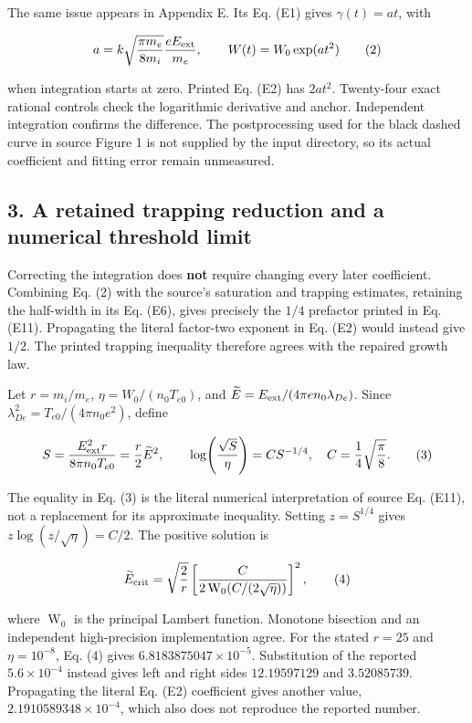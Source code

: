 The same issue appears in Appendix E. Its Eq. (E1) gives
\(\gamma(t)=at\), with

\[
a=k\sqrt{\frac{\pi m_e}{8m_i}}\frac{eE_{\rm ext}}{m_e},
\qquad W(t)=W_0\exp(at^2)
\tag{2}
\]

when integration starts at zero. Printed Eq. (E2) has \(2at^2\).
Twenty-four exact rational controls check the logarithmic derivative and
anchor. Independent integration confirms the difference. The
postprocessing used for the black dashed curve in source Figure 1 is not
supplied by the input directory, so its actual coefficient and fitting
error remain unmeasured.

\subsection{3. A retained trapping reduction and a numerical threshold
limit}\label{a-retained-trapping-reduction-and-a-numerical-threshold-limit}

Correcting the integration does \textbf{not} require changing every
later coefficient. Combining Eq. (2) with the source's saturation and
trapping estimates, retaining the half-width in its Eq. (E6), gives
precisely the \(1/4\) prefactor printed in Eq. (E11). Propagating the
literal factor-two exponent in Eq. (E2) would instead give \(1/2\). The
printed trapping inequality therefore agrees with the repaired growth
law.

Let \(r=m_i/m_e\), \(\eta=W_0/(n_0T_{e0})\), and
\(\widetilde E=E_{\rm ext}/(4\pi en_0\lambda_{De})\). Since
\(\lambda_{De}^2=T_{e0}/(4\pi n_0e^2)\), define

\[
S=\frac{E_{\rm ext}^2r}{8\pi n_0T_{e0}}
=\frac r2\widetilde E^2,\qquad
\log\!\left(\frac{\sqrt S}{\eta}\right)=C S^{-1/4},
\quad C=\frac14\sqrt{\frac\pi8}.
\tag{3}
\]

The equality in Eq. (3) is the literal numerical interpretation of
source Eq. (E11), not a replacement for its approximate inequality.
Setting \(z=S^{1/4}\) gives \(z\log(z/\sqrt\eta)=C/2\). The positive
solution is

\[
\widetilde E_{\rm crit}=\sqrt{\frac2r}
\left[\frac{C}{2\operatorname{W}_0(C/(2\sqrt\eta))}\right]^2,
\tag{4}
\]

where \(\operatorname{W}_0\) is the principal Lambert function. Monotone
bisection and an independent high-precision implementation agree. For
the stated \(r=25\) and \(\eta=10^{-8}\), Eq. (4) gives
\(6.8183875047\times10^{-5}\). Substitution of the reported
\(5.6\times10^{-4}\) instead gives left and right sides \(12.19597129\)
and \(3.52085739\). Propagating the literal Eq. (E2) coefficient gives
another value, \(2.1910589348\times10^{-4}\), which also does not
reproduce the reported number.

